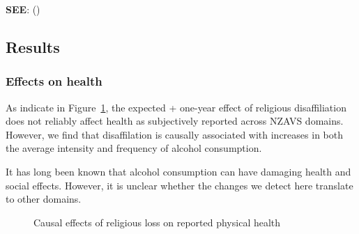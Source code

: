 \documentclass[
  singlecolumn,
  9pt]{article}
\begin{document}
\textbf{SEE}: ()

\subsection{Results}\label{results}

\subsubsection{Effects on health}\label{effects-on-health}

As indicate in Figure~\ref{fig-results-health}, the expected + one-year
effect of religious disaffiliation does not reliably affect health as
subjectively reported across NZAVS domains. However, we find that
disaffilation is causally associated with increases in both the average
intensity and frequency of alcohol consumption.

It has long been known that alcohol consumption can have damaging health
and social effects. However, it is unclear whether the changes we detect
here translate to other domains.

\begin{figure}


\caption{\label{fig-results-health}Causal effects of religious loss on
reported physical health}

\end{figure}%
\end{document}
